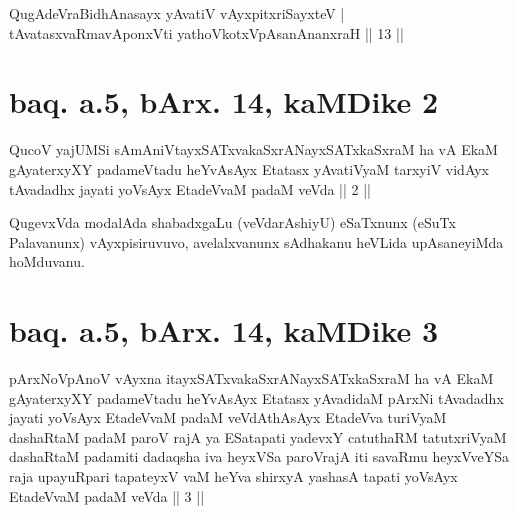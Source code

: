 
\begin{shl}
\footnotemark[2]{}QugAdeVraBidhAnasayx yAvatiV vAyxpitxriSayxteV | \\
tAvatasxvaRmavAponxVti yathoVkotxVpAsanAnanxraH \hfill ||  13 || 
\end{shl}

\section*{baq. a.5, bArx. 14, kaMDike 2}

\begin{shl}
QucoV yajUMSi sAmAniVtayxSATxvakaSxrANayxSATxkaSxraM ha vA EkaM gAyaterxyXY padameVtadu heYvAsAyx Etatasx yAvatiVyaM tarxyiV vidAyx tAvadadhx jayati yoV\s sAyx EtadeVvaM padaM veVda || 2 ||
\end{shl}

\begin{artha} 
QugevxVda modalAda shabadxgaLu (veVdarAshiyU) eSaTxnunx (eSuTx 
Palavanunx) vAyxpisiruvuvo, avelalxvanunx sAdhakanu heVLida 
upAsaneyiMda hoMduvanu.
\end{artha}

\section*{baq. a.5, bArx. 14, kaMDike 3}

\begin{shl}
pArxNoV\s pAnoV vAyxna itayxSATxvakaSxrANayxSATxkaSxraM ha vA EkaM gAyaterxyXY padameVtadu heYvAsAyx Etatasx yAvadidaM pArxNi tAvadadhx jayati yoV\s sAyx EtadeVvaM padaM veVdAthAsAyx EtadeVva turiVyaM dashaRtaM padaM paroV rajA ya ESatapati yadevxY catuthaRM tatutxriVyaM dashaRtaM padamiti dadaqsha iva heyxVSa paroVrajA iti savaRmu heyxVveYSa raja upayuRpari tapateyxV vaM heYva shirxyA yashasA tapati yoV\s sAyx EtadeVvaM padaM veVda || 3 ||
\end{shl}


